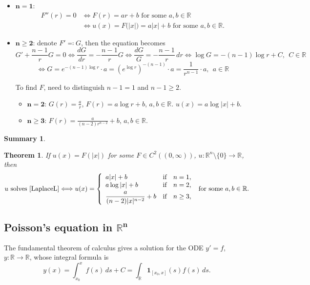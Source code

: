\documentclass[12pt]{article}
\newtheorem{theorem}{Theorem}[section]
\theoremstyle{definition}
\newtheorem*{summary}{Summary}
\begin{document}
\begin{itemize}
\item $\boldsymbol{n=1}$:
\begin{align*}
F''(r)=0&\Longleftrightarrow F(r)=ar+b\text{ for some }a,b\in\mathbb{R}\\
&\Longleftrightarrow u(x)=F\big(|x|\big)=a|x|+b\text{ for some }a,b\in\mathbb{R}.
\end{align*}

\item $\boldsymbol{n\geq2}$: denote $F'\eqqcolon G$, then the equation becomes
\[G'+\frac{n-1}{r}G=0\Leftrightarrow\frac{dG}{dr}=-\frac{n-1}{r}G\Leftrightarrow\frac{dG}{G}=-\frac{n-1}{r}\,dr\Leftrightarrow\log G=-(n-1)\log r+C,\ \ C\in\mathbb{R}\]\[\Leftrightarrow G=e^{-(n-1)\log r}\cdot a=\left(e^{\log r}\right)^{-(n-1)}\cdot a=\frac{1}{r^{n-1}}\cdot a,\ \ a\in\mathbb{R}\]

To find $F$, need to distinguish $n-1=1$ and $n-1\geq2$.

\begin{itemize}
\item $\boldsymbol{n=2}$: $G(r)=\frac{a}{r}$, $F(r)=a\log r+b$, $a,b\in\mathbb{R}$. $u(x)=a\log|x|+b$.

\item $\boldsymbol{n\geq3}$: $F(r)=\frac{a}{(n-2)r^{n-2}}+b$, $a,b\in\mathbb{R}$.
\end{itemize}
\end{itemize}

\begin{summary}
\begin{theorem}
If $u(x)=F(|x|)$ for some $F\in C^2((0,\infty))$, $u:\mathbb{R}^n\setminus\{0\}\rightarrow\mathbb{R}$, then
\[u\text{ solves \eqref{LaplaceL}}\Longleftrightarrow u(x)=\left\{\begin{array}{lll}a|x|+b&\text{if}&n=1,\\a\log|x|+b&\text{if}&n=2,\vspace{1mm}\\\displaystyle{\frac{a}{(n-2)|x|^{n-2}}+b}&\text{if}&n\geq3,\end{array}\right.\text{ for some }a,b\in\mathbb{R}.\]
\end{theorem}
\end{summary}

\subsection[Poisson's equation in \texorpdfstring{$\mathbb{R}^n$}{R\^{}n}]{Poisson's equation in \texorpdfstring{$\boldsymbol{\mathbb{R}^n}$}{R\^{}n}}
The fundamental theorem of calculus gives a solution for the ODE $y'=f$, $y:\mathbb{R}\rightarrow\mathbb{R}$, whose integral formula is
\[y(x)=\int_{x_0}^xf(s)\,ds+C=\int_{\mathbb{R}}\boldsymbol{1}_{[x_0,x]}(s)f(s)\,ds.\]
\end{document}
